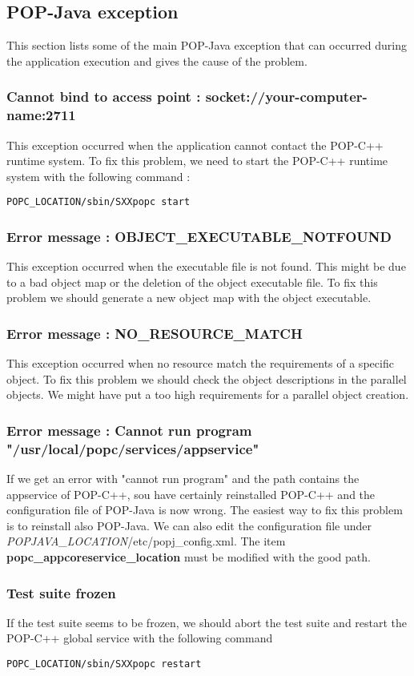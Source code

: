 \label{trouble}

\subsection{POP-Java exception}
This section lists some of the main POP-Java exception that can occurred during the application execution and gives the cause of the problem.

\subsubsection{Cannot bind to access point : socket://your-computer-name:2711}
This exception occurred when the application cannot contact the POP-C++ runtime system. To fix this problem, we need to start the POP-C++ runtime system with the following command : 

\begin{lstlisting}
POPC_LOCATION/sbin/SXXpopc start
\end{lstlisting}

\subsubsection{Error message : OBJECT\_EXECUTABLE\_NOTFOUND}
This exception occurred when the executable file is not found. This might be due to a bad object map or the deletion of the object executable file. To fix this problem we should generate a new object map with the object executable.

\subsubsection{Error message : NO\_RESOURCE\_MATCH}
This exception occurred when no resource match the requirements of a specific object. To fix this problem we should check the object descriptions in the parallel objects. We might have put a too high requirements for a parallel object creation.

\subsubsection{Error message : Cannot run program "/usr/local/popc/services/appservice"}
If we get an error with "cannot run program" and the path contains the appservice of POP-C++, sou have certainly reinstalled POP-C++ and the configuration file of POP-Java is now wrong. The easiest way to fix this problem is to reinstall also POP-Java. We can also edit the configuration file under \textit{POPJAVA\_LOCATION}/etc/popj\_config.xml. The item \textbf{popc\_appcoreservice\_location} must be modified with the good path.

\subsubsection{Test suite frozen}
If the test suite seems to be frozen, we should abort the test suite and restart the POP-C++ global service with the following command
\begin{lstlisting}
POPC_LOCATION/sbin/SXXpopc restart
\end{lstlisting}
